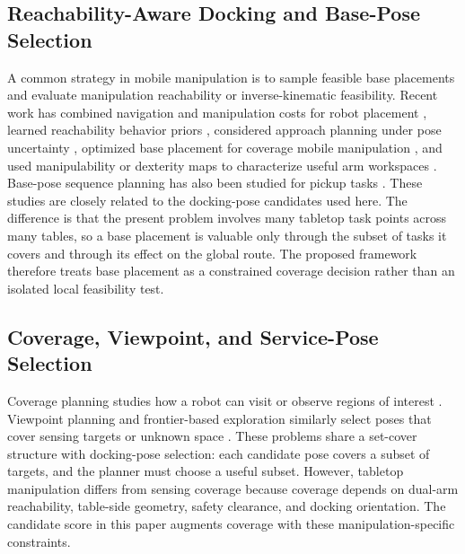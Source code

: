 \subsection{Reachability-Aware Docking and Base-Pose Selection}
A common strategy in mobile manipulation is to sample feasible base placements and evaluate manipulation reachability or inverse-kinematic feasibility. Recent work has combined navigation and manipulation costs for robot placement \cite{reister2022combining}, learned reachability behavior priors \cite{jauhri2022reachability}, considered approach planning under pose uncertainty \cite{yamazaki2022approaching}, optimized base placement for coverage mobile manipulation \cite{zhang2023baseplacement}, and used manipulability or dexterity maps to characterize useful arm workspaces \cite{sereinig2024comfort,yao2024edm}. Base-pose sequence planning has also been studied for pickup tasks \cite{naik2024basenet}. These studies are closely related to the docking-pose candidates used here. The difference is that the present problem involves many tabletop task points across many tables, so a base placement is valuable only through the subset of tasks it covers and through its effect on the global route. The proposed framework therefore treats base placement as a constrained coverage decision rather than an isolated local feasibility test.

\subsection{Coverage, Viewpoint, and Service-Pose Selection}
Coverage planning studies how a robot can visit or observe regions of interest \cite{choset2001coverage}. Viewpoint planning and frontier-based exploration similarly select poses that cover sensing targets or unknown space \cite{yamauchi1997frontier}. These problems share a set-cover structure with docking-pose selection: each candidate pose covers a subset of targets, and the planner must choose a useful subset. However, tabletop manipulation differs from sensing coverage because coverage depends on dual-arm reachability, table-side geometry, safety clearance, and docking orientation. The candidate score in this paper augments coverage with these manipulation-specific constraints.

